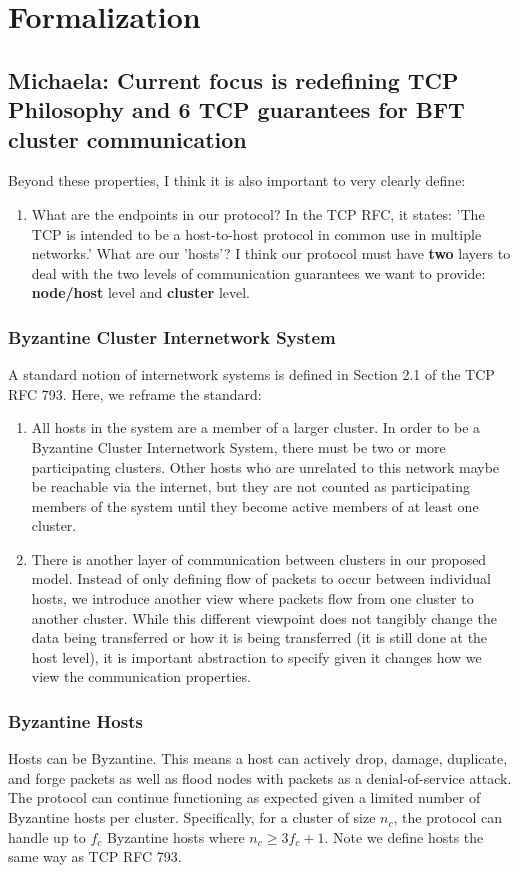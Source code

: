 \section{Formalization}
\subsection{Michaela: Current focus is redefining TCP Philosophy and 6 TCP guarantees for BFT cluster communication}
Beyond these properties, I think it is also important to very clearly define:
\begin{enumerate}
    \item What are the endpoints in our protocol? In the TCP RFC, it states: 'The TCP is intended to be a host-to-host protocol 
        in common use in multiple networks.' What are our 'hosts'? I think our protocol must have \textbf{two} layers to deal with
        the two levels of communication guarantees we want to provide: \textbf{node/host} level and \textbf{cluster} level.
\end{enumerate}

\subsubsection{Byzantine Cluster Internetwork System}
A standard notion of internetwork systems is defined in Section 2.1 of the TCP RFC 793. Here, we reframe the standard:
\begin{enumerate}
    \item All hosts in the system are a member of a larger cluster. In order to be a Byzantine Cluster Internetwork System, there must be two or more participating clusters. Other hosts who are unrelated to this network maybe be reachable via the internet, but they are not counted as participating members of the system until they become active members of at least one cluster.
    \item There is another layer of communication between clusters in our proposed model. Instead of only defining flow of packets to occur between individual hosts, we introduce another view where packets flow from one cluster to another cluster. While this different viewpoint does not tangibly change the data being transferred or how it is being transferred (it is still done at the host level), it is important abstraction to specify given it changes how we view the communication properties.
\end{enumerate}

\subsubsection{Byzantine Hosts}
Hosts can be Byzantine. This means a host can actively drop, damage, duplicate, and forge packets as well as flood nodes with packets as a denial-of-service attack. The protocol can continue functioning as expected given a limited number of Byzantine hosts per cluster. Specifically, for a cluster of size $n_c$, the protocol can handle up to $f_c$ Byzantine hosts where $n_c \geq 3f_c + 1$. Note we define hosts the same way as TCP RFC 793.

